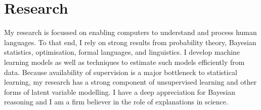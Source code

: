 \section*{Research}

My research is focussed on enabling computers to understand and process human languages. To that end, I rely on strong results from probability theory, Bayesian statistics, optimisation, formal languages, and linguistics. I develop machine learning models as well as techniques to estimate such models efficiently from data. Because availability of supervision is a major bottleneck to statistical learning, my research has a strong component of unsupervised learning and other forms of latent variable modelling. 
I have a deep appreciation for Bayesian reasoning and I am a firm believer in the role of explanations in science. 